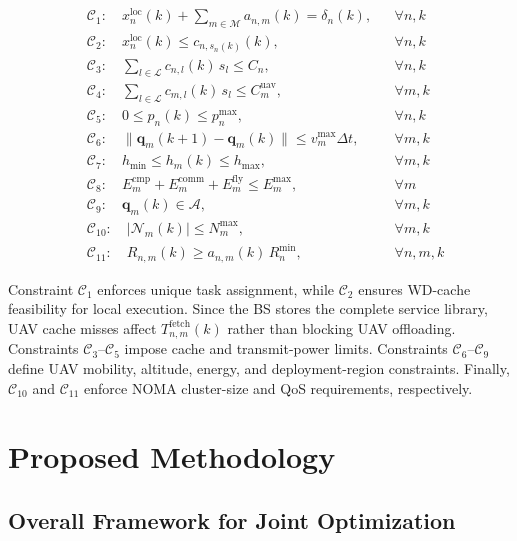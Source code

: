 \documentclass[journal]{IEEEtran}
\begin{document}
\begin{align}
&\mathcal{C}_1:\quad
x_n^{\mathrm{loc}}(k) + \sum_{m\in\mathcal{M}} a_{n,m}(k)
= \delta_n(k),
&& \forall n,k
\label{eq:c1}\\
&\mathcal{C}_2:\quad
x_n^{\mathrm{loc}}(k) \leq c_{n,s_n(k)}(k),
&& \forall n,k
\label{eq:c2}\\
&\mathcal{C}_3:\quad
\sum_{l\in\mathcal{L}} c_{n,l}(k)\,s_l \leq C_n,
&& \forall n,k
\label{eq:c3}\\
&\mathcal{C}_4:\quad
\sum_{l\in\mathcal{L}} c_{m,l}(k)\,s_l \leq C_m^{\mathrm{uav}},
&& \forall m,k
\label{eq:c4}\\
&\mathcal{C}_5:\quad
0 \leq p_n(k) \leq p_n^{\max},
&& \forall n,k
\label{eq:c5}\\
&\mathcal{C}_6:\quad
\|\mathbf{q}_m(k+1)-\mathbf{q}_m(k)\|
\le v_m^{\max}\Delta t,
&& \forall m,k
\label{eq:c6}\\
&\mathcal{C}_7:\quad
h_{\min}\le h_m(k)\le h_{\max},
&& \forall m,k
\label{eq:c7}\\
&\mathcal{C}_8:\quad
E_m^{\mathrm{cmp}} + E_m^{\mathrm{comm}} + E_m^{\mathrm{fly}}
\leq E_m^{\max},
&& \forall m
\label{eq:c8}\\
&\mathcal{C}_9:\quad
\mathbf{q}_m(k)\in\mathcal{A},
&& \forall m,k
\label{eq:c9}\\
&\mathcal{C}_{10}:\quad
|\mathcal{N}_m(k)| \le N_m^{\max},
&& \forall m,k
\label{eq:c10}\\
&\mathcal{C}_{11}:\quad
R_{n,m}(k) \ge a_{n,m}(k)\,R_n^{\min},
&& \forall n,m,k
\label{eq:c11}
\end{align}

Constraint $\mathcal{C}_1$ enforces unique task assignment, while $\mathcal{C}_2$ ensures WD-cache feasibility for local execution. Since the BS stores the complete service library, UAV cache misses affect $T_{n,m}^{\mathrm{fetch}}(k)$ rather than blocking UAV offloading. Constraints $\mathcal{C}_3$--$\mathcal{C}_5$ impose cache and transmit-power limits. Constraints $\mathcal{C}_6$--$\mathcal{C}_9$ define UAV mobility, altitude, energy, and deployment-region constraints. Finally, $\mathcal{C}_{10}$ and $\mathcal{C}_{11}$ enforce NOMA cluster-size and QoS requirements, respectively.

\section{Proposed Methodology}
\label{section_IV}
\subsection{Overall Framework for Joint Optimization}
\end{document}
